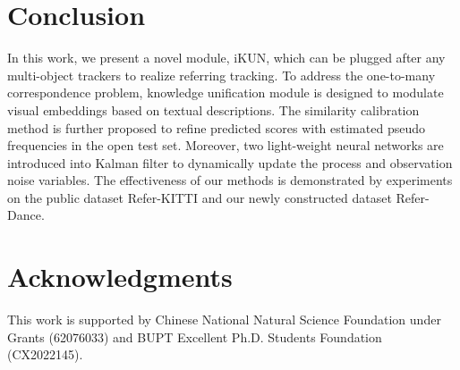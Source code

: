 \documentclass[10pt,twocolumn,letterpaper]{article}
\begin{document}
\section{Conclusion}
    In this work, we present a novel module, iKUN, which can be plugged after any multi-object trackers to realize referring tracking.
    To address the one-to-many correspondence problem, knowledge unification module is designed to modulate visual embeddings based on textual descriptions.
    The similarity calibration method is further proposed to refine predicted scores with estimated pseudo frequencies in the open test set.
    Moreover, two light-weight neural networks are introduced into Kalman filter to dynamically update the process and observation noise variables.
    The effectiveness of our methods is demonstrated by experiments on the public dataset Refer-KITTI and our newly constructed dataset Refer-Dance.

\section*{Acknowledgments}
    This work is supported by Chinese National Natural Science Foundation under Grants (62076033)
    and BUPT Excellent Ph.D. Students Foundation (CX2022145).

% 
{
    \small
    
    
}
\end{document}
